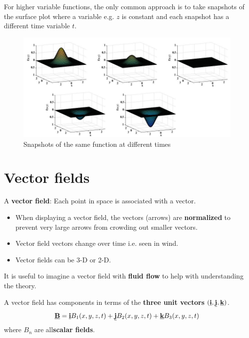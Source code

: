 \documentclass[10pt,a4paper]{article}
\begin{document}
For higher variable functions, the only common approach is to take snapshots of the surface plot
where a variable e.g. $z$ is constant and each snapshot has a different time variable $t$.
\begin{figure} [h!]
    \centering
    \includegraphics[scale=0.6]{Snapshots.JPG}
    \caption{Snapshots of the same function at different times}
\end{figure}

\section{Vector fields}

A \textbf{vector field}: Each point in space is associated with a vector. 
\begin{itemize}
    \item When displaying a vector field, the vectors (arrows) are \textbf{normalized} to prevent
    very large arrows from crowding out smaller vectors.
    \item Vector field vectors change over time i.e. seen in wind.
    \item Vector fields can be 3-D or 2-D.
\end{itemize}

It is useful to imagine a vector field with \textbf{fluid flow} to help with understanding the
theory.

A vector field has components in terms of the \textbf{three unit vectors} 
$(\textbf{\underline{i}},\textbf{\underline{j}},\textbf{\underline{k}})$.
$$
    \textbf{\underline{B}} = \textbf{\underline{i}}B_1(x,y,z,t)+\textbf{\underline{j}}B_2(x,y,z,t)+\textbf{\underline{k}}B_3(x,y,z,t)
$$
where $B_n$ are all\textbf{scalar fields}. \par 
\end{document}
